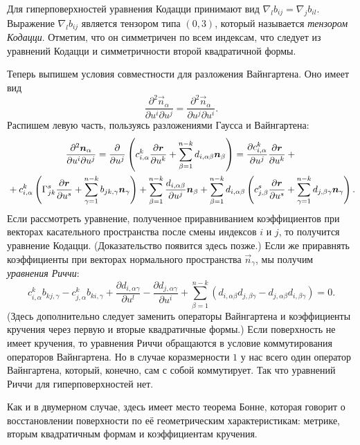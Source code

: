 Для гиперповерхностей уравнения Кодацци принимают вид $\nabla_lb_{ij} = \nabla_jb_{il}$. Выражение $\nabla_lb_{ij}$ является тензором типа $(0, 3)$, который называется \textit{тензором Кодацци}. Отметим, что он симметричен по всем индексам, что следует из уравнений Кодацци и симметричности второй квадратичной формы.

Теперь выпишем условия совместности для разложения Вайнгартена. Оно имеет вид
\[
	\frac{\partial^2\vec{n}_\alpha}{\partial u^i\partial u^j} = \frac{\partial^2\vec{n}_\alpha}{\partial u^j\partial u^i}.
\]
Распишем левую часть, пользуясь разложениями Гаусса и Вайнгартена:
\begin{multline*}
	\frac{\partial^2\boldsymbol{n}_\alpha}{\partial u^i\partial u^j} = \frac{\partial}{\partial u^j}\left(c_{i, \alpha}^k\frac{\partial\boldsymbol{r}}{\partial u^k} + \sum_{\beta = 1}^{n - k}d_{i, \alpha\beta}\boldsymbol{n}_\beta\right) = \frac{\partial c_{i, \alpha}^k}{\partial u^j}\frac{\partial\boldsymbol{r}}{\partial u^k} + {}\\{} + c_{i, \alpha}^k\left(\Gamma_{jk}^s\frac{\partial\boldsymbol{r}}{\partial u^s} + \sum_{\gamma = 1}^{n - k}b_{jk, \gamma}\boldsymbol{n}_\gamma\right) + \sum_{\beta = 1}^{n - k}\frac{d_{i, \alpha\beta}}{\partial u^j}\boldsymbol{n}_{\beta} + \sum_{\beta = 1}^{n - k}d_{i, \alpha\beta}\left(c_{j, \beta}^s\frac{\partial\boldsymbol{r}}{\partial u^s} + \sum_{\gamma = 1}^{n - k}d_{j, \beta\gamma}\boldsymbol{n}_\gamma\right).
\end{multline*}
Если рассмотреть уравнение, полученное приравниванием коэффициентов при векторах касательного пространства после смены индексов $i$ и $j$, то получится уравнение Кодацци. (Доказательство появится здесь позже.) Если же приравнять коэффициенты при векторах нормального пространства $\vec{n}_{\gamma}$, мы получим \textit{уравнения Риччи}:
\[
	c_{i, \alpha}^kb_{kj, \gamma} - c_{j, \alpha}^kb_{ki, \gamma} + \frac{\partial d_{i, \alpha\gamma}}{\partial u^l} - \frac{\partial d_{j, \alpha\gamma}}{\partial u^i} + \sum_{\beta = 1}^{n - k}(d_{i, \alpha\beta}d_{j, \beta\gamma} - d_{j, \alpha\beta}d_{i, \beta\gamma}) = 0.
\]
(Здесь дополнительно следует заменить операторы Вайнгартена и коэффициенты кручения через первую и вторые квадратичные формы.) Если поверхность не имеет кручения, то уравнения Риччи обращаются в условие коммутирования операторов Вайнгартена. Но в случае коразмерности $1$ у нас всего один оператор Вайнгартена, который, конечно, сам с собой коммутирует. Так что уравнений Риччи для гиперповерхностей нет.

Как и в двумерном случае, здесь имеет место теорема Бонне, которая говорит о восстановлении поверхности по её геометрическим характеристикам: метрике, вторым квадратичным формам и коэффициентам кручения.

